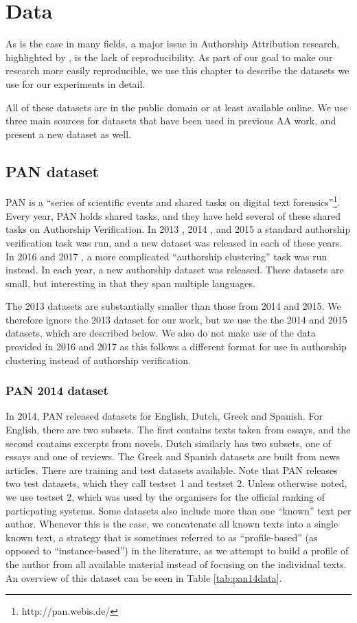 \chapter{Data}
\label{chap:data}
As is the case in many fields, a major issue in Authorship Attribution research, highlighted by \citet{potthast2016wrote}, is the lack of reproducibility. As part of our goal to make our research more easily reproducible, we use this chapter to describe the datasets we use for our experiments in detail. 

All of these datasets are in the public domain or at least available online. We use three main sources for datasets that have been used in previous AA work, and present a new dataset as well.

\section{PAN dataset}
PAN is a ``series of scientific events and shared tasks on digital text forensics''\footnote{http://pan.webis.de/}. Every year, PAN holds shared tasks, and they have held several of these shared tasks on Authorship Verification. In 2013 \cite{juola2013overview}, 2014 \cite{stamatatos2015overview}, and 2015 \cite{stamatatos2015overview} a standard authorship verification task was run, and a new dataset was released in each of these years. In 2016 \cite{stein2016overview} and 2017 \cite{stein2017overview}, a more complicated ``authorship clustering'' task was run instead. In each year, a new authorship dataset was released. These datasets are small, but interesting in that they span multiple languages.

The 2013 datasets are substantially smaller than those from 2014 and 2015. We therefore ignore the 2013 dataset for our work, but we use the the 2014 and 2015 datasets, which are described below. We also do not make use of the data provided in 2016 and 2017 as this follows a different format for use in authorship clustering instead of authorship verification. 

\subsection{PAN 2014 dataset}
In 2014, PAN released datasets for English, Dutch, Greek and Spanish. For English, there are two subsets. The first contains texts taken from essays, and the second contains excerpts from novels. Dutch similarly has two subsets, one of essays and one of reviews. The Greek and Spanish datasets are built from news articles. There are training and test datasets available. Note that PAN releases two test datasets, which they call testset 1 and testset 2. Unless otherwise noted, we use testset 2, which was used by the organisers for the official ranking of particpating systems. Some datasets also include more than one ``known'' text per author. Whenever this is the case, we concatenate all known texts into a single known text, a strategy that is sometimes referred to as ``profile-based'' (as opposed to ``instance-based'') in the literature, as we attempt to build a profile of the author from all available material instead of focusing on the individual texts. An overview of this dataset can be seen in Table \ref{tab:pan14data}.

